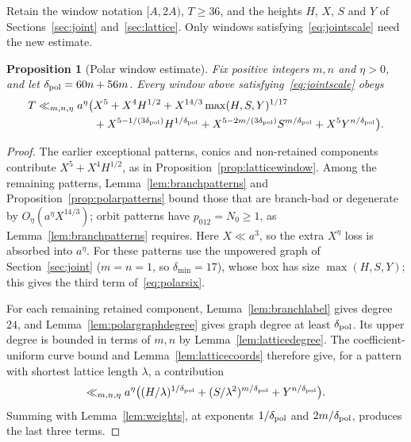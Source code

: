 \documentclass[11pt]{article}
\newtheorem{proposition}[theorem]{Proposition}
\theoremstyle{definition}
\theoremstyle{remark}
\begin{document}
Retain the window notation $[A,2A)$, $T\ge36$, and the heights $H$, $X$, $S$
and $Y$ of Sections~\ref{sec:joint} and~\ref{sec:lattice}.
Only windows satisfying~\eqref{eq:jointscale} need the new estimate.

\begin{proposition}[Polar window estimate]\label{prop:polarwindow}
Fix positive integers $m,n$ and $\eta>0$, and let $\delta_{\rm pol}=60n+56m$.
Every window above satisfying~\eqref{eq:jointscale} obeys
\begin{equation}\label{eq:polarsix}
\begin{split}
 T\ll_{m,n,\eta}a^\eta\bigl(&X^5+X^4H^{1/2}
 +X^{14/3}\max(H,S,Y)^{1/17}\\
 &+X^{5-1/(3\delta_{\rm pol})}H^{1/\delta_{\rm pol}}
 +X^{5-2m/(3\delta_{\rm pol})}S^{m/\delta_{\rm pol}}+X^5Y^{n/\delta_{\rm pol}}\bigr).
\end{split}
\end{equation}
\end{proposition}
\begin{proof}
The earlier exceptional patterns, conics and non-retained components contribute
$X^5+X^4H^{1/2}$, as in Proposition~\ref{prop:latticewindow}.
Among the remaining patterns, Lemma~\ref{lem:branchpatterns} and
Proposition~\ref{prop:polarpatterns} bound those that are branch-bad or
degenerate by $O_\eta(a^\eta X^{14/3})$; orbit patterns have $p_{012}=N_0\ge1$, as
Lemma~\ref{lem:branchpatterns} requires.
Here $X\ll a^3$, so the extra $X^\eta$ loss is absorbed into $a^\eta$.
For these patterns use the unpowered graph of Section~\ref{sec:joint}
($m=n=1$, so $\delta_{\min}=17$), whose box has size $\max(H,S,Y)$; this gives
the third term of~\eqref{eq:polarsix}.

For each remaining retained component, Lemma~\ref{lem:branchlabel}
gives degree $24$, and Lemma~\ref{lem:polargraphdegree} gives graph degree
at least $\delta_{\rm pol}$. Its upper degree is bounded in terms of $m,n$ by
Lemma~\ref{lem:latticedegree}. The coefficient-uniform curve bound
and Lemma~\ref{lem:latticecoords} therefore give, for a pattern with shortest
lattice length $\lambda$, a contribution
\[
 \ll_{m,n,\eta}a^\eta\bigl((H/\lambda)^{1/\delta_{\rm pol}}+(S/\lambda^2)^{m/\delta_{\rm pol}}+Y^{n/\delta_{\rm pol}}\bigr).
\]
Summing with Lemma~\ref{lem:weights}, at exponents $1/\delta_{\rm pol}$ and $2m/\delta_{\rm pol}$,
produces the last three terms.
\end{proof}
\end{document}
